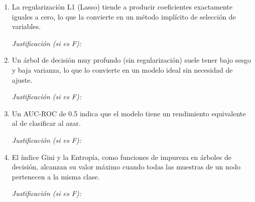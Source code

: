\documentclass[11pt,a4paper]{article}
\begin{document}
\begin{enumerate}[label=\textbf{\arabic*.}, leftmargin=*, itemsep=18pt]
\vspace{0.2cm}
\underline{\hspace{14cm}}

\item \underline{\hspace{1cm}} La regularizaci\'on L1 (Lasso) tiende a producir coeficientes exactamente iguales a cero, lo que la convierte en un m\'etodo impl\'icito de selecci\'on de variables.

\vspace{0.5cm}
\noindent\textit{Justificaci\'on (si es F):} \underline{\hspace{12cm}}

\vspace{0.2cm}
\underline{\hspace{14cm}}

\item \underline{\hspace{1cm}} Un \'arbol de decisi\'on muy profundo (sin regularizaci\'on) suele tener bajo sesgo y baja varianza, lo que lo convierte en un modelo ideal sin necesidad de ajuste.

\vspace{0.5cm}
\noindent\textit{Justificaci\'on (si es F):} \underline{\hspace{12cm}}

\vspace{0.2cm}
\underline{\hspace{14cm}}

\item \underline{\hspace{1cm}} Un AUC-ROC de 0.5 indica que el modelo tiene un rendimiento equivalente al de clasificar al azar.

\vspace{0.5cm}
\noindent\textit{Justificaci\'on (si es F):} \underline{\hspace{12cm}}

\vspace{0.2cm}
\underline{\hspace{14cm}}

\item \underline{\hspace{1cm}} El \'indice Gini y la Entrop\'ia, como funciones de impureza en \'arboles de decisi\'on, alcanzan su valor m\'aximo cuando todas las muestras de un nodo pertenecen a la misma clase.

\vspace{0.5cm}
\noindent\textit{Justificaci\'on (si es F):} \underline{\hspace{12cm}}

\vspace{0.2cm}
\underline{\hspace{14cm}}

\end{enumerate}
\end{document}
